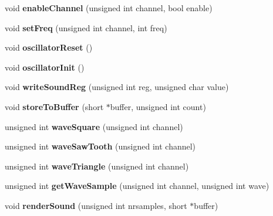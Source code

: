 \begin{DoxyCompactItemize}
\item 
\mbox{\label{class_t_e_d_a76620cc9fe3f0efff72d5045c0b5805f}} 
void {\bfseries enable\+Channel} (unsigned int channel, bool enable)
\item 
\mbox{\label{class_t_e_d_a48913adcbe831734622577b731a17f20}} 
void {\bfseries set\+Freq} (unsigned int channel, int freq)
\item 
\mbox{\label{class_t_e_d_a9a648c64eb948542eda1588027e10973}} 
void {\bfseries oscillator\+Reset} ()
\item 
\mbox{\label{class_t_e_d_aeb5e9b156c226c87914725bee45f6453}} 
void {\bfseries oscillator\+Init} ()
\item 
\mbox{\label{class_t_e_d_ada8e32e2b153ae86e66b4c7e23fda668}} 
void {\bfseries write\+Sound\+Reg} (unsigned int reg, unsigned char value)
\item 
\mbox{\label{class_t_e_d_a03eaaed843f9f2c43e1b4df64ea66462}} 
void {\bfseries store\+To\+Buffer} (short $\ast$buffer, unsigned int count)
\item 
\mbox{\label{class_t_e_d_ae0a48ef70bdaf38213d593104c0f0293}} 
unsigned int {\bfseries wave\+Square} (unsigned int channel)
\item 
\mbox{\label{class_t_e_d_a2cc3598759ada2d10a2812640c6b7304}} 
unsigned int {\bfseries wave\+Saw\+Tooth} (unsigned int channel)
\item 
\mbox{\label{class_t_e_d_a5a3281608b37495d5b386e786a85096d}} 
unsigned int {\bfseries wave\+Triangle} (unsigned int channel)
\item 
\mbox{\label{class_t_e_d_a3e685f8a8a8d00022f35289eb90344fb}} 
unsigned int {\bfseries get\+Wave\+Sample} (unsigned int channel, unsigned int wave)
\item 
\mbox{\label{class_t_e_d_a6284ec4a86ad8d8aed2f43314bbae12a}} 
void {\bfseries render\+Sound} (unsigned int nrsamples, short $\ast$buffer)

\end{DoxyCompactItemize}
